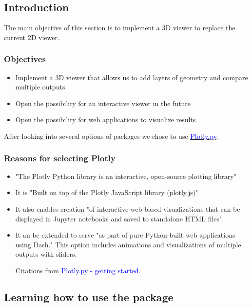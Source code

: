 

\subsection{Introduction}
The main objective of this section is to implement a 3D viewer to replace the current 2D viewer. 

\subsubsection{Objectives}
\begin{itemize}
    \item Implement a 3D viewer that allows us to add layers of geometry and compare multiple outputs
    \item Open the possibility for an interactive viewer in the future
    \item Open the possibility for web applications to visualize results
\end{itemize}

After looking into several options of packages we chose to use \href{https://plotly.com/python/}{\textcolor{blue}{Plotly.py}}. 

\subsubsection{Reasons for selecting Plotly}
\begin{itemize}
    \item "The Plotly Python library is an interactive, open-source plotting library"
    \item It is "Built on top of the Plotly JavaScript library (plotly.js)"
    \item It also enables creation "of interactive web-based visualizations that can be displayed in Jupyter notebooks and saved to standalone HTML files"
    \item It an be extended to serve "as part of pure Python-built web applications using Dash." This option includes animations and visualizations of multiple outputs with sliders.
    
Citations from \href{https://plotly.com/python/getting-started/}{\textcolor{blue}{Plotly.py - getting started}}.
\end{itemize}

\subsection{Learning how to use the package}

